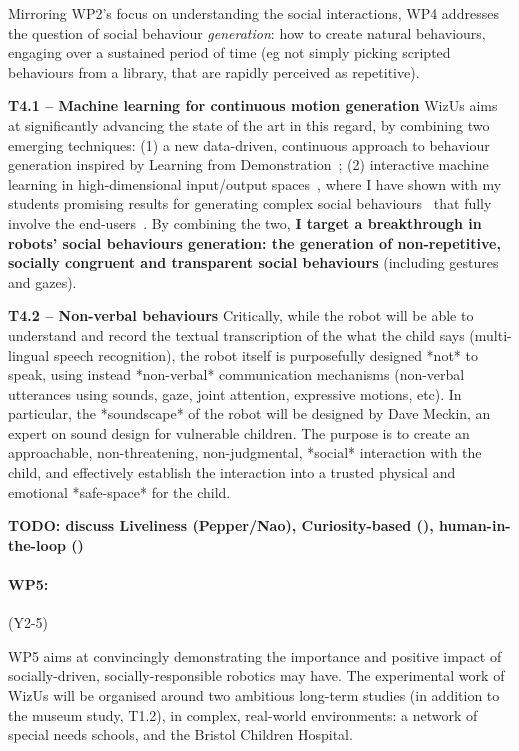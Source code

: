 \documentclass[11pt,a4paper]{report}
\newcommand{\project}{WizUs\xspace}
\newcommand{\TODO}[1]{{\color{red}\textbf{TODO: #1}}}
\begin{document}
Mirroring WP2's focus on understanding the social interactions, WP4 addresses the
question of social behaviour \emph{generation}: how to create natural
behaviours, engaging over a sustained period of time (eg not simply picking
scripted behaviours from a library, that are rapidly perceived as repetitive).

\textbf{T4.1 -- Machine learning for continuous motion generation} \project aims
at significantly advancing the state of the art in this regard, by combining two
emerging techniques: (1) a new data-driven, continuous approach to behaviour
generation inspired by Learning from Demonstration~\cite{citationneeded}; (2)
interactive machine learning in high-dimensional input/output
spaces~\cite{senft2020woz}, where I have shown with my students promising
results for generating complex social behaviours~\cite{senft2019teaching,
winkle2020coach} that fully involve the end-users~\cite{winkle2020methodology}.
By combining the two, \textbf{I target a breakthrough in robots' social
behaviours generation: the generation of non-repetitive, socially congruent and
transparent social behaviours} (including gestures and gazes).


\textbf{T4.2 -- Non-verbal behaviours} Critically, while the robot will be able to understand and record the textual
transcription of the what the child says (multi-lingual speech recognition),
the robot itself is purposefully designed *not* to speak, using instead *non-verbal*
communication mechanisms (non-verbal utterances using sounds, gaze, joint
attention, expressive motions, etc). In particular, the *soundscape* of the
robot will be designed by Dave Meckin, an expert on sound design for vulnerable
children. The purpose is to create an approachable, non-threatening,
non-judgmental, *social* interaction with the child, and effectively establish
the interaction into a trusted physical and emotional *safe-space* for the
child.




\TODO{discuss Liveliness (Pepper/Nao), Curiosity-based (\cite{kaplan}),
human-in-the-loop (\cite{senft, winkle})}

\paragraph{WP5: \textbf{\wpFive}} (Y2-5)

WP5 aims at convincingly demonstrating the importance and positive impact of
socially-driven, socially-responsible robotics may have. The experimental work
of \project will be organised around two ambitious long-term studies (in
addition to the museum study, T1.2), in complex, real-world environments: a
network of special needs schools, and the Bristol Children Hospital.
\end{document}
